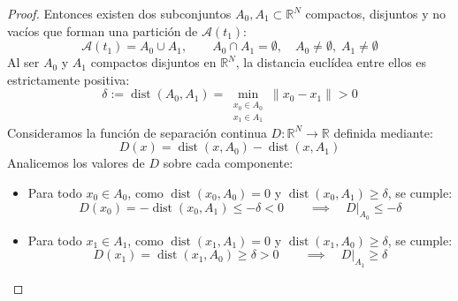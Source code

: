 \begin{proof}
    Entonces existen dos subconjuntos $A_0, A_1 \subset \mathbb{R}^N$ compactos, disjuntos y no vacíos que forman una partición de $\mathcal{A}(t_1)$:
    \[
        \mathcal{A}(t_1) = A_0 \cup A_1, \qquad A_0 \cap A_1 = \emptyset, \quad A_0 \neq \emptyset, \; A_1 \neq \emptyset
    \]
    Al ser $A_0$ y $A_1$ compactos disjuntos en $\mathbb{R}^N$, la distancia euclídea entre ellos es estrictamente positiva:
    \[
        \delta := \operatorname{dist}(A_0, A_1) = \min_{\substack{x_0 \in A_0 \\ x_1 \in A_1}} \|x_0 - x_1\| > 0
    \]
    Consideramos la función de separación continua $D: \mathbb{R}^N \to \mathbb{R}$ definida mediante:
    \[
        D(x) = \operatorname{dist}(x, A_0) - \operatorname{dist}(x, A_1)
    \]
    Analicemos los valores de $D$ sobre cada componente:
    \begin{itemize}
        \item Para todo $x_0 \in A_0$, como $\operatorname{dist}(x_0, A_0) = 0$ y $\operatorname{dist}(x_0, A_1) \geq \delta$, se cumple:
        \[
            D(x_0) = -\operatorname{dist}(x_0, A_1) \leq -\delta < 0 \qquad \implies \quad D\big|_{A_0} \leq -\delta
        \]
        \item Para todo $x_1 \in A_1$, como $\operatorname{dist}(x_1, A_1) = 0$ y $\operatorname{dist}(x_1, A_0) \geq \delta$, se cumple:
        \[
            D(x_1) = \operatorname{dist}(x_1, A_0) \geq \delta > 0 \qquad \implies \quad D\big|_{A_1} \geq \delta
        \]
    \end{itemize}

    \begin{center}
\end{center}
\end{proof}
